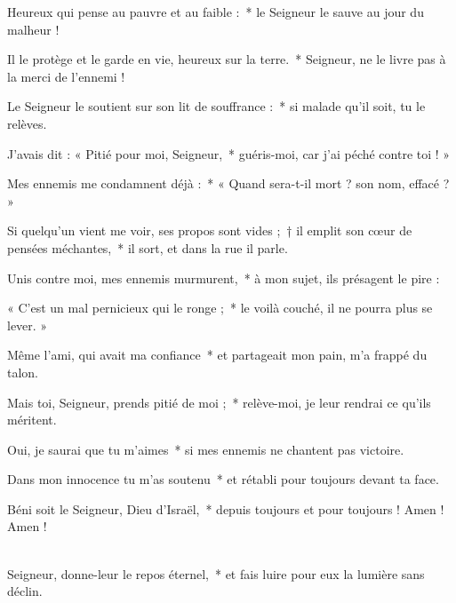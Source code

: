 \item Heureux qui pense au pauvre et au faible :~* le Seigneur le sauve au jour du malheur !

\item Il le protège et le garde en vie, heureux sur la terre.~* Seigneur, ne le livre pas à la merci de l'ennemi !

\item Le Seigneur le soutient sur son lit de souffrance :~* si malade qu'il soit, tu le relèves.

\item J'avais dit : « Pitié pour moi, Seigneur,~* guéris-moi, car j'ai péché contre toi ! »

\item Mes ennemis me condamnent déjà :~* « Quand sera-t-il mort ? son nom, effacé ? »

\item Si quelqu'un vient me voir, ses propos sont vides ;~† il emplit son cœur de pensées méchantes,~* il sort, et dans la rue il parle.

\item Unis contre moi, mes ennemis murmurent,~* à mon sujet, ils présagent le pire :

\item « C'est un mal pernicieux qui le ronge ;~* le voilà couché, il ne pourra plus se lever. »

\item Même l'ami, qui avait ma confiance~* et partageait mon pain, m'a frappé du talon.

\item Mais toi, Seigneur, prends pitié de moi ;~* relève-moi, je leur rendrai ce qu'ils méritent.

\item Oui, je saurai que tu m'aimes~* si mes ennemis ne chantent pas victoire.

\item Dans mon innocence tu m'as soutenu~* et rétabli pour toujours devant ta face.

\item Béni soit le Seigneur, Dieu d'Israël,~* depuis toujours et pour toujours ! Amen ! Amen !

\item ~\\Seigneur, donne-leur le repos éternel,~* et fais luire pour eux la lumière sans déclin.